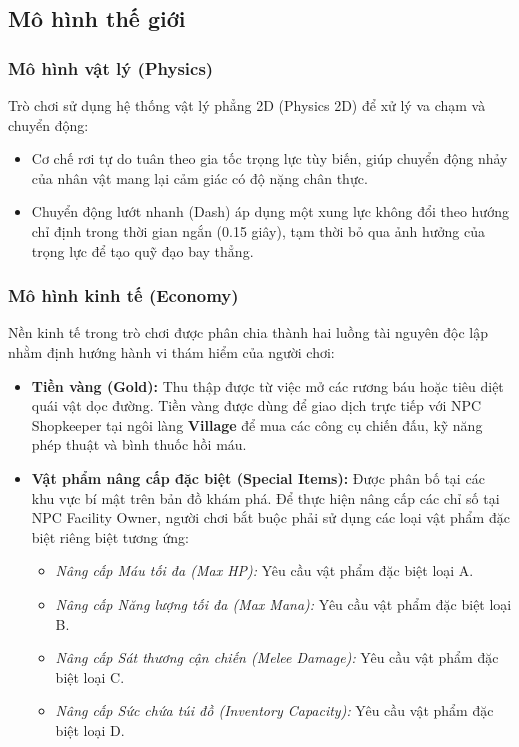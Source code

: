 \documentclass[../DoAn.tex]{subfiles}
\begin{document}
\subsection{Mô hình thế giới}
\label{subsection:3.3.2}

\subsubsection{Mô hình vật lý (Physics)}
Trò chơi sử dụng hệ thống vật lý phẳng 2D (Physics 2D) để xử lý va chạm và chuyển động:
\begin{itemize}
    \item Cơ chế rơi tự do tuân theo gia tốc trọng lực tùy biến, giúp chuyển động nhảy của nhân vật mang lại cảm giác có độ nặng chân thực.
    \item Chuyển động lướt nhanh (Dash) áp dụng một xung lực không đổi theo hướng chỉ định trong thời gian ngắn (0.15 giây), tạm thời bỏ qua ảnh hưởng của trọng lực để tạo quỹ đạo bay thẳng.
\end{itemize}

\subsubsection{Mô hình kinh tế (Economy)}
Nền kinh tế trong trò chơi được phân chia thành hai luồng tài nguyên độc lập nhằm định hướng hành vi thám hiểm của người chơi:
\begin{itemize}
    \item \textbf{Tiền vàng (Gold):} Thu thập được từ việc mở các rương báu hoặc tiêu diệt quái vật dọc đường. Tiền vàng được dùng để giao dịch trực tiếp với NPC Shopkeeper tại ngôi làng \textbf{Village} để mua các công cụ chiến đấu, kỹ năng phép thuật và bình thuốc hồi máu.
    \item \textbf{Vật phẩm nâng cấp đặc biệt (Special Items):} Được phân bố tại các khu vực bí mật trên bản đồ khám phá. Để thực hiện nâng cấp các chỉ số tại NPC Facility Owner, người chơi bắt buộc phải sử dụng các loại vật phẩm đặc biệt riêng biệt tương ứng:
    \begin{itemize}
        \item \textit{Nâng cấp Máu tối đa (Max HP):} Yêu cầu vật phẩm đặc biệt loại A.
        \item \textit{Nâng cấp Năng lượng tối đa (Max Mana):} Yêu cầu vật phẩm đặc biệt loại B.
        \item \textit{Nâng cấp Sát thương cận chiến (Melee Damage):} Yêu cầu vật phẩm đặc biệt loại C.
        \item \textit{Nâng cấp Sức chứa túi đồ (Inventory Capacity):} Yêu cầu vật phẩm đặc biệt loại D.
    \end{itemize}
\end{itemize}
\end{document}

